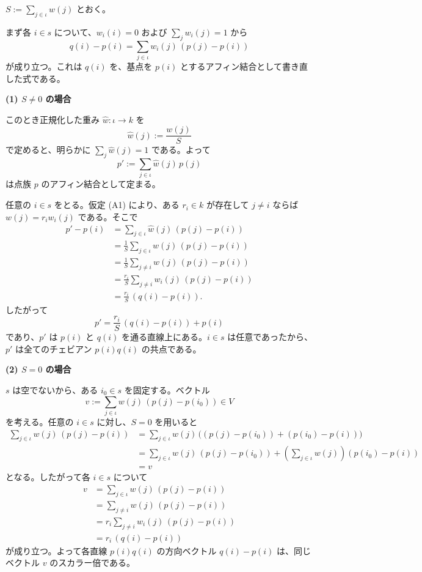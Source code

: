 \documentclass[a4paper,12pt]{bxjsbook}
\makeatletter
\newlength{\customindent}
\theoremstyle{theorem}
\renewenvironment{proof}[1][\proofname]{%
  \par\pushQED{\qed}%
  \normalfont
  \topsep6\p@\@plus6\p@\relax
  \list{}{%
    \leftmargin=\customindent
    \rightmargin=0pt
    \labelwidth=0pt
    \labelsep=0pt
    \itemindent=0pt
    \listparindent=0pt
    \parsep=0pt
  }%
  \item[\itshape #1\@addpunct{.}\hspace{0.5em}]%
  \setlength{\displayindent}{\customindent}%
  \setlength{\displaywidth}{\dimexpr\linewidth-\customindent\relax}%
  \ignorespaces
}{%
  \popQED\endlist\@endpefalse
}
\makeatother
\begin{document}
    \begin{proof}
        $S:=\sum_{j\in\iota}w(j)$ とおく。

        まず各 $i\in s$ について、$w_i(i)=0$ および $\sum_j w_i(j)=1$ から
        \[
          q(i)-p(i)=\sum_{j\in\iota} w_i(j)\,(p(j)-p(i))
        \]
        が成り立つ。これは $q(i)$ を、基点を $p(i)$ とするアフィン結合として書き直した式である。

        \medskip
        \noindent\textbf{(1) $S\neq 0$ の場合}\par
        このとき正規化した重み $\widehat w:\iota\to k$ を
        \[
          \widehat w(j):=\frac{w(j)}{S}
        \]
        で定めると、明らかに $\sum_j \widehat w(j)=1$ である。よって
        \[
          p':=\sum_{j\in\iota}\widehat w(j)\,p(j)
        \]
        は点族 $p$ のアフィン結合として定まる。

        任意の $i\in s$ をとる。仮定 (A1) により、ある $r_i\in k$ が存在して $j\neq i$ ならば $w(j)=r_i w_i(j)$ である。そこで
        \[
        \begin{aligned}
          p'-p(i)
            &= \sum_{j\in\iota}\widehat w(j)\,(p(j)-p(i)) \\
            &= \frac{1}{S}\sum_{j\in\iota}w(j)\,(p(j)-p(i)) \\
            &= \frac{1}{S}\sum_{j\neq i}w(j)\,(p(j)-p(i)) \\
            &= \frac{r_i}{S}\sum_{j\neq i}w_i(j)\,(p(j)-p(i)) \\
            &= \frac{r_i}{S}\,(q(i)-p(i)).
        \end{aligned}
        \]
        したがって
        \[
          p' = \frac{r_i}{S}\,(q(i)-p(i)) + p(i)
        \]
        であり、$p'$ は $p(i)$ と $q(i)$ を通る直線上にある。$i\in s$ は任意であったから、$p'$ は全てのチェビアン $p(i)q(i)$ の共点である。

        \medskip
        \noindent\textbf{(2) $S=0$ の場合}\par
        $s$ は空でないから、ある $i_0\in s$ を固定する。ベクトル
        \[
          v:=\sum_{j\in\iota} w(j)\,(p(j)-p(i_0))\in V
        \]
        を考える。任意の $i\in s$ に対し、$S=0$ を用いると
        \[
        \begin{aligned}
          \sum_{j\in\iota} w(j)\,(p(j)-p(i))
            &= \sum_{j\in\iota} w(j)\,\bigl((p(j)-p(i_0))+(p(i_0)-p(i))\bigr) \\
            &= \sum_{j\in\iota} w(j)\,(p(j)-p(i_0)) + \left(\sum_{j\in\iota} w(j)\right)(p(i_0)-p(i)) \\
            &= v
        \end{aligned}
        \]
        となる。したがって各 $i\in s$ について
        \[
        \begin{aligned}
          v
            &= \sum_{j\in\iota} w(j)\,(p(j)-p(i)) \\
            &= \sum_{j\neq i} w(j)\,(p(j)-p(i)) \\
            &= r_i \sum_{j\neq i} w_i(j)\,(p(j)-p(i)) \\
            &= r_i\,(q(i)-p(i))
        \end{aligned}
        \]
        が成り立つ。よって各直線 $p(i)q(i)$ の方向ベクトル $q(i)-p(i)$ は、同じベクトル $v$ のスカラー倍である。


\end{proof}
\end{document}
